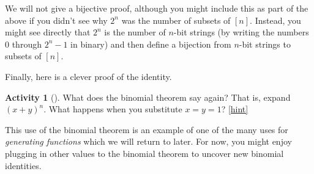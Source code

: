 \documentclass[10pt,]{book}
\theoremstyle{plain}
\theoremstyle{definition}
\theoremstyle{definition}
\theoremstyle{definition}
\newtheorem{activity}[project]{Activity}
\numberwithin{equation}{chapter}
\begin{document}
\hypertarget{p-585}{}%
We will not give a bijective proof, although you might include this as part of the above if you didn't see why \(2^n\) was the number of subsets of \([n]\).  Instead, you might see directly that \(2^n\) is the number of \(n\)-bit strings (by writing the numbers 0 through \(2^n - 1\) in binary) and then define a bijection from \(n\)-bit strings to subsets of \([n]\).%
\par
\hypertarget{p-586}{}%
Finally, here is a clever proof of the identity.%
\begin{activity}[]\label{act-pascalrowsum-binom}
\hypertarget{p-587}{}%
What does the binomial theorem say again?  That is, expand \((x+y)^n\).  What happens when you substitute \(x = y = 1\)?%
\hfill{\tiny\hyperlink{a-79}{[hint]}\hypertarget{q-79}{}}\end{activity}
\hypertarget{p-589}{}%
This use of the binomial theorem is an example of one of the many uses for \emph{generating functions} which we will return to later.  For now, you might enjoy plugging in other values to the binomial theorem to uncover new binomial identities.%
\typeout{************************************************}
\typeout{************************************************}
\end{document}
